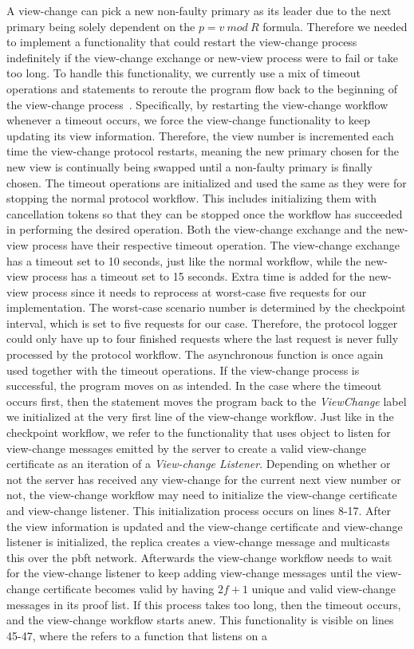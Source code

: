 A view-change can pick a new non-faulty primary as its leader due to the next primary being solely dependent on the $p = v ~mod~ R$ formula. Therefore we needed to implement a functionality that could restart the view-change process indefinitely if the view-change exchange or new-view process were to fail or take too long. To handle this functionality, we currently use a mix of timeout operations and  statements to reroute the program flow back to the beginning of the view-change process~\cite{WEB:goto}. Specifically, by restarting the view-change workflow whenever a timeout occurs, we force the view-change functionality to keep updating its view information. Therefore, the view number is incremented each time the view-change protocol restarts, meaning the new primary chosen for the new view is continually being swapped until a non-faulty primary is finally chosen. The timeout operations are initialized and used the same as they were for stopping the normal protocol workflow. This includes initializing them with cancellation tokens so that they can be stopped once the workflow has succeeded in performing the desired operation. Both the view-change exchange and the new-view process have their respective timeout operation. The view-change exchange has a timeout set to 10 seconds, just like the normal workflow, while the new-view process has a timeout set to 15 seconds. Extra time is added for the new-view process since it needs to reprocess at worst-case five requests for our implementation. The worst-case scenario number is determined by the checkpoint interval, which is set to five requests for our case. Therefore, the protocol logger could only have up to four finished requests where the last request is never fully processed by the protocol workflow. The  asynchronous function is once again used together with the timeout operations. If the view-change process is successful, the program moves on as intended. In the case where the timeout occurs first, then the  statement moves the program back to the \emph{ViewChange} label we initialized at the very first line of the view-change workflow. Just like in the checkpoint workflow, we refer to the functionality that uses  object to listen for view-change messages emitted by the server to create a valid view-change certificate as an iteration of a \emph{View-change Listener}. Depending on whether or not the server has received any view-change for the current next view number or not, the view-change workflow may need to initialize the view-change certificate and view-change listener. This initialization process occurs on lines 8-17. After the view information is updated and the view-change certificate and view-change listener is initialized, the replica creates a view-change message and multicasts this over the \ac{pbft} network. Afterwards the view-change workflow needs to wait for the view-change listener to keep adding view-change messages until the view-change certificate becomes valid by having $2f+1$ unique and valid view-change messages in its proof list. If this process takes too long, then the timeout occurs, and the view-change workflow starts anew. This functionality is visible on lines 45-47, where the  refers to a function that listens on a 